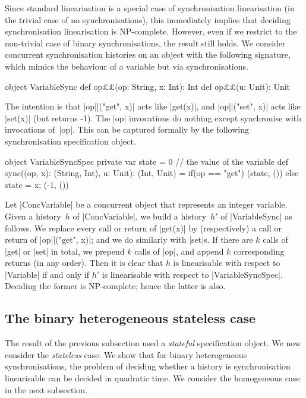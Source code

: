 Since standard linearisation is a special case of synchronisation
linearisation (in the trivial case of no synchronisations), this immediately
implies that deciding synchronisation linearisation is NP-complete.  However,
even if we restrict to the non-trivial case of binary synchronisations, the
result still holds.
%
We consider concurrent synchronisation histories on an object with the
following signature, which mimics the behaviour of a variable but via
synchronisations. 
%
\begin{scala}
object VariableSync{
  def op££(op: String, x: Int): Int
  def op££(u: Unit): Unit
} 
\end{scala}
%
The intention is that |op||("get", x)| acts like |get(x)|, and
|op||("set", x)| acts like |set(x)| (but returns -1).  The |op|
invocations do nothing except synchronise with invocations of~|op|.  This
can be captured formally by the following synchronisation specification
object.
%
\begin{scala}
object VariableSyncSpec{
  private var state = 0   // the value of the variable
  def sync((op, x): (String, Int), u: Unit): (Int, Unit) = 
    if(op == "get") (state, ()) else{ state = x; (-1, ()) }
}
\end{scala}


Let |ConcVariable| be a concurrent object that represents an integer variable.
Given a history~$h$ of |ConcVariable|, we build a history~$h'$ of
|VariableSync| as follows.  We replace every call or return of |get(x)| by
(respectively) a call or return of |op||("get", x)|; and we do similarly
with |set|s.  If there are $k$ calls of |get| or |set| in total, we prepend
$k$ calls of |op|, and append $k$ corresponding returns (in any order).
%
Then it is clear that $h$ is linearisable with respect to |Variable| if and
only if $h'$ is linearisable with respect to |VariableSyncSpec|.  Deciding the
former is NP-complete; hence the latter is also. 




\subsection{The binary heterogeneous stateless case}
\label{sec:binary-heterogeneous}

The result of the previous subsection used a \emph{stateful} specification
object.  We now consider the \emph{stateless} case.  We show that for binary
heterogeneous synchronisations, the problem of deciding whether a history is
synchronisation linearisable can be decided in quadratic time.  We consider
the homogeneous case in the next subsection.

